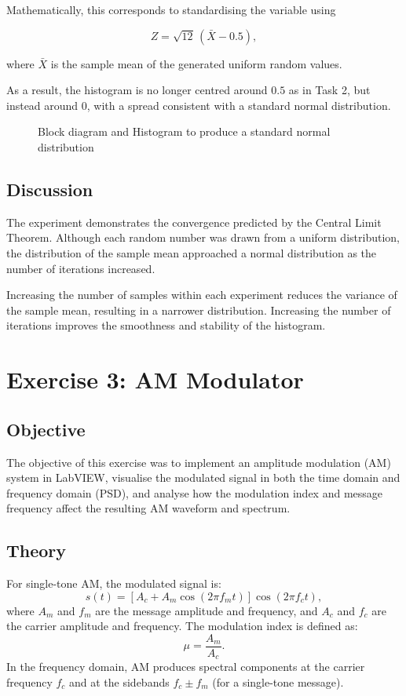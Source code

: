 \documentclass[../../main.tex]{subfiles}
\begin{document}
Mathematically, this corresponds to standardising the variable using

\[
Z = \sqrt{12}\,(\bar{X}-0.5),
\]

where $\bar{X}$ is the sample mean of the generated uniform random values.

As a result, the histogram is no longer centred around $0.5$ as in Task 2, but instead around $0$, with a spread consistent with a standard normal distribution.

\begin{figure}[htbp]
    \centering
    \caption{Block diagram and Histogram to produce a standard normal distribution}
\end{figure}

\FloatBarrier

\subsection{Discussion}

The experiment demonstrates the convergence predicted by the Central Limit Theorem. Although each random number was drawn from a uniform distribution, the distribution of the sample mean approached a normal distribution as the number of iterations increased.

Increasing the number of samples within each experiment reduces the variance of the sample mean, resulting in a narrower distribution. Increasing the number of iterations improves the smoothness and stability of the histogram.

\newpage
\section{Exercise 3: AM Modulator}

\subsection{Objective}
The objective of this exercise was to implement an amplitude modulation (AM) system in LabVIEW, visualise the modulated signal in both the time domain and frequency domain (PSD), and analyse how the modulation index and message frequency affect the resulting AM waveform and spectrum.

\subsection{Theory}
For single-tone AM, the modulated signal is:
\[
s(t)=\left[A_c + A_m\cos(2\pi f_m t)\right]\cos(2\pi f_c t),
\]
where $A_m$ and $f_m$ are the message amplitude and frequency, and $A_c$ and $f_c$ are the carrier amplitude and frequency. The modulation index is defined as:
\[
\mu = \frac{A_m}{A_c}.
\]
In the frequency domain, AM produces spectral components at the carrier frequency $f_c$ and at the sidebands $f_c \pm f_m$ (for a single-tone message).
\end{document}

